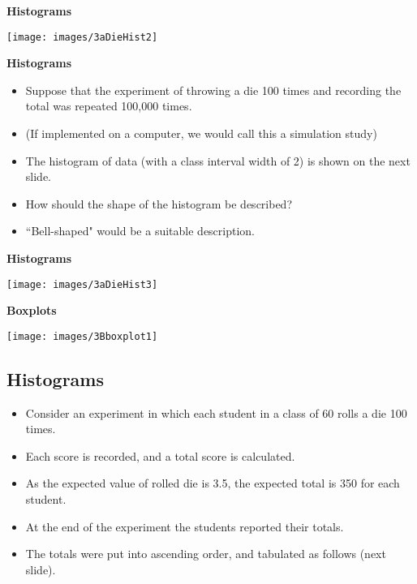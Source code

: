 \documentclass[]{report}
\begin{document}

{
\textbf{Histograms}

\begin{center}
\texttt{[image: images/3aDieHist2]}
\end{center}

}

{
\textbf{Histograms}
\begin{itemize}
\item  Suppose that the experiment of throwing a die 100 times and recording the total was repeated 100,000 times.
\item  (If implemented on a computer, we would call this a simulation study)
\item  The histogram of data (with a class interval width of 2) is shown on the next slide.
\item  How should the shape of the histogram be described?
\item  ``Bell-shaped" would be a suitable description.
\end{itemize}
}

{
\textbf{Histograms}

\begin{center}
\texttt{[image: images/3aDieHist3]}
\end{center}

}





{
\textbf{Boxplots}

\begin{center}
\texttt{[image: images/3Bboxplot1]}
\end{center}
}



{
\subsection{Histograms}
\begin{itemize}
\item Consider an experiment in which each student in a class of 60 rolls a die 100 times.
\item Each score is recorded, and a total score is calculated.
\item As the expected value of rolled die is 3.5, the expected total is 350 for each student.
\item At the end of the experiment the students reported their totals.
\item The totals were put into ascending order, and tabulated as follows (next slide).
\end{itemize}

}
\end{document}
